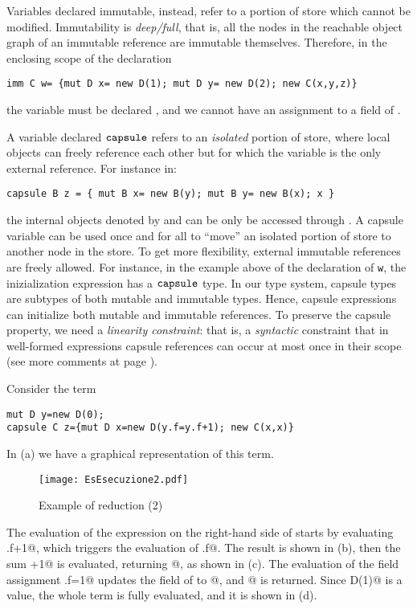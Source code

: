 Variables declared immutable, instead, {refer to a portion of store which cannot be modified.}
 Immutability is \emph{deep/full}, that is, all the nodes in the reachable object graph of an immutable reference are immutable themselves.
Therefore, in the enclosing scope of the declaration
\begin{lstlisting}
imm C w= {mut D x= new D(1); mut D y= new D(2); new C(x,y,z)}
\end{lstlisting}
the variable \Q@z@ must be declared \Q@imm@, and we cannot have an assignment to a field of \Q@w@. 

A variable declared $\texttt{capsule}$ refers to an \emph{isolated} portion of store, where local objects can freely reference
each other but for which the variable is the only external reference. For instance in:
\begin{lstlisting}
capsule B z = { mut B x= new B(y); mut B y= new B(x); x } 
\end{lstlisting}
the internal objects denoted by \Q@x@ and \Q@y@ can be only be accessed  through \Q@z@. A capsule variable can be used 
once and for all to ``move'' an isolated portion of store 
to another node in the store. To get more flexibility, external immutable 
references are freely allowed.  For instance, in the example above of the declaration of \lstinline{w}{}, the inizialization expression has a $\texttt{capsule}$ type.
In our type system, capsule types are subtypes of both mutable and immutable types. Hence,
capsule expressions can initialize both mutable and immutable references. To preserve the capsule property, we need a 
{\em linearity constraint}: that is, a \emph{syntactic} constraint that in well-formed expressions capsule references 
can occur at most once in their scope (see more comments at page \pageref{linearity}). 

Consider the term\label{capsule-example-1}
\begin{lstlisting}
mut D y=new D(0); 
capsule C z={mut D x=new D(y.f=y.f+1); new C(x,x)}
\end{lstlisting}
In (a) we have a graphical representation of this term. 
\begin{figure}[ht]
\begin{center}
\texttt{[image: EsEsecuzione2.pdf]}
\end{center}
\caption{Example of reduction (2)} \label{fig:esRed2}
\end{figure}
The evaluation of the expression on the right-hand side of \Q@x@ starts by evaluating 
\Q@y.f+1@, which triggers the evaluation of \Q@y.f@. The result is shown in (b),
then the sum +1@ is evaluated, returning @, as shown in (c). The evaluation of 
the field assignment 
\Q@y.f=1@ updates the field \Q@f@ of \Q@y@ to @, and @ is returned.
Since \Q@new D(1)@ is a value, the whole term is fully evaluated, and 
it is shown in (d). 

